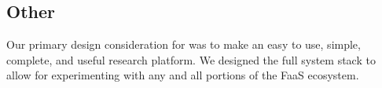 \subsection{Other}


Our primary design consideration for \sysname{} was to make an easy to use, simple, complete, and useful research platform.
We designed the full system stack to allow for experimenting with any and all portions of the FaaS ecosystem.

